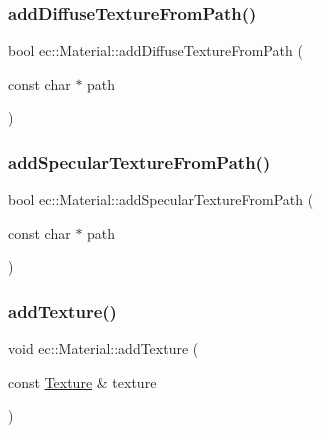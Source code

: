 \subsubsection{\texorpdfstring{add\+Diffuse\+Texture\+From\+Path()}{addDiffuseTextureFromPath()}}
{\footnotesize\ttfamily bool ec\+::\+Material\+::add\+Diffuse\+Texture\+From\+Path (\begin{DoxyParamCaption}\item[{const char $\ast$}]{path }\end{DoxyParamCaption})}

\mbox{\label{classec_1_1_material_a103e561a848fc52cd5ca5b45050f4318}} 
\subsubsection{\texorpdfstring{add\+Specular\+Texture\+From\+Path()}{addSpecularTextureFromPath()}}
{\footnotesize\ttfamily bool ec\+::\+Material\+::add\+Specular\+Texture\+From\+Path (\begin{DoxyParamCaption}\item[{const char $\ast$}]{path }\end{DoxyParamCaption})}

\mbox{\label{classec_1_1_material_aad92ada3fcc1f7b66e6bf3b6aeac73b8}} 
\subsubsection{\texorpdfstring{add\+Texture()}{addTexture()}}
{\footnotesize\ttfamily void ec\+::\+Material\+::add\+Texture (\begin{DoxyParamCaption}\item[{const \mbox{\hyperlink{classec_1_1_texture}{Texture}} \&}]{texture }\end{DoxyParamCaption})}

\mbox{\label{classec_1_1_material_a68e143f6390ae7e9bc6c080853191f94}} 
